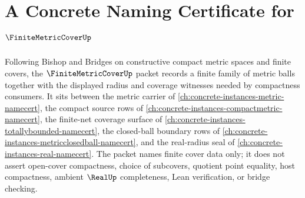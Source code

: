 \chapter{A Concrete Naming Certificate for $\FiniteMetricCoverUp$}
\label{ch:concrete-instances-finite-metric-cover-namecert}

Following Bishop and Bridges on constructive compact metric spaces and finite covers, the $\FiniteMetricCoverUp$ packet records a finite family of metric balls together with the displayed radius and coverage witnesses needed by compactness consumers. It sits between the metric carrier of \autoref{ch:concrete-instances-metric-namecert}, the compact source rows of \autoref{ch:concrete-instances-compactmetric-namecert}, the finite-net coverage surface of \autoref{ch:concrete-instances-totallybounded-namecert}, the closed-ball boundary rows of \autoref{ch:concrete-instances-metricclosedball-namecert}, and the real-radius seal of \autoref{ch:concrete-instances-real-namecert}. The packet names finite cover data only; it does not assert open-cover compactness, choice of subcovers, quotient point equality, host compactness, ambient $\RealUp$ completeness, Lean verification, or bridge checking.


